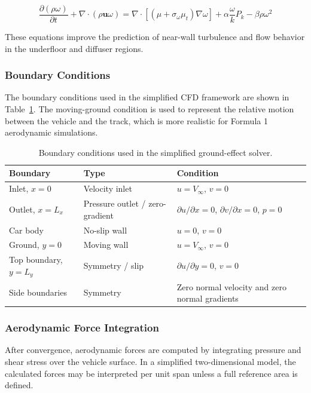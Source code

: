 \documentclass[12pt,a4paper]{article}
\begin{document}
\begin{equation}
    \frac{\partial(\rho\omega)}{\partial t} + \nabla \cdot (\rho \bm{u}\omega) =\nabla \cdot\left[(\mu+\sigma_{\omega}\mu_t)\nabla \omega\right]+\alpha\frac{\omega}{k}P_k-\beta\rho\omega^2
\end{equation}

These equations improve the prediction of near-wall turbulence and flow behavior in the
underfloor and diffuser regions.

\subsubsection{Boundary Conditions}

The boundary conditions used in the simplified CFD framework are shown in
Table~\ref{tab:solver_boundary_conditions}. The moving-ground condition is used to
represent the relative motion between the vehicle and the track, which is more realistic
for Formula 1 aerodynamic simulations.

\begin{table}[H]
\centering
\caption{Boundary conditions used in the simplified ground-effect solver.}
\label{tab:solver_boundary_conditions}
\begin{tabular}{p{3.2cm}p{4cm}p{6cm}}
\toprule
\textbf{Boundary} & \textbf{Type} & \textbf{Condition} \\
\midrule
Inlet, $x=0$ & Velocity inlet & $u=V_{\infty}$, $v=0$ \\
Outlet, $x=L_x$ & Pressure outlet / zero-gradient & $\partial u/\partial x=0$, $\partial v/\partial x=0$, $p=0$ \\
Car body & No-slip wall & $u=0$, $v=0$ \\
Ground, $y=0$ & Moving wall & $u=V_{\infty}$, $v=0$ \\
Top boundary, $y=L_y$ & Symmetry / slip & $\partial u/\partial y=0$, $v=0$ \\
Side boundaries & Symmetry & Zero normal velocity and zero normal gradients \\
\bottomrule
\end{tabular}
\end{table}

\subsubsection{Aerodynamic Force Integration}

After convergence, aerodynamic forces are computed by integrating pressure and shear
stress over the vehicle surface. In a simplified two-dimensional model, the calculated
forces may be interpreted per unit span unless a full reference area is defined.
\end{document}
